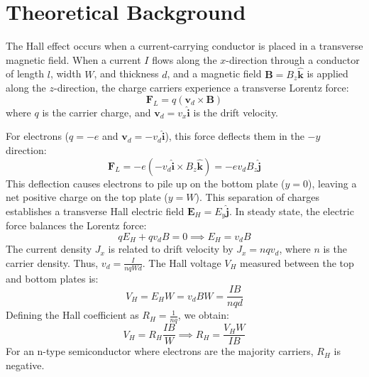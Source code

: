 \documentclass[a4paper,11pt]{article}
\begin{document}
\section{Theoretical Background}
The Hall effect occurs when a current-carrying conductor is placed in a transverse magnetic field. When a current $I$ flows along the $x$-direction through a conductor of length $l$, width $W$, and thickness $d$, and a magnetic field $\mathbf{B} = B_z \hat{\mathbf{k}}$ is applied along the $z$-direction, the charge carriers experience a transverse Lorentz force:
\begin{equation}
    \mathbf{F}_L = q (\mathbf{v}_d \times \mathbf{B})
\end{equation}
where $q$ is the carrier charge, and $\mathbf{v}_d = v_x \hat{\mathbf{i}}$ is the drift velocity. 

For electrons ($q = -e$ and $\mathbf{v}_d = -v_d \hat{\mathbf{i}}$), this force deflects them in the $-y$ direction:
\begin{equation}
    \mathbf{F}_L = -e (-v_d \hat{\mathbf{i}} \times B_z \hat{\mathbf{k}}) = -e v_d B_z \hat{\mathbf{j}}
\end{equation}
This deflection causes electrons to pile up on the bottom plate ($y=0$), leaving a net positive charge on the top plate ($y=W$). This separation of charges establishes a transverse Hall electric field $\mathbf{E}_H = E_y \hat{\mathbf{j}}$. In steady state, the electric force balances the Lorentz force:
\begin{equation}
    q E_H + q v_d B = 0 \implies E_H = v_d B
\end{equation}
The current density $J_x$ is related to drift velocity by $J_x = n q v_d$, where $n$ is the carrier density. Thus, $v_d = \frac{I}{n q W d}$. The Hall voltage $V_H$ measured between the top and bottom plates is:
\begin{equation}
    V_H = E_H W = v_d B W = \frac{I B}{n q d}
\end{equation}
Defining the Hall coefficient as $R_H = \frac{1}{n q}$, we obtain:
\begin{equation}
    V_H = R_H \frac{I B}{W} \implies R_H = \frac{V_H W}{I B}
\end{equation}
For an n-type semiconductor where electrons are the majority carriers, $R_H$ is negative. 
\end{document}

